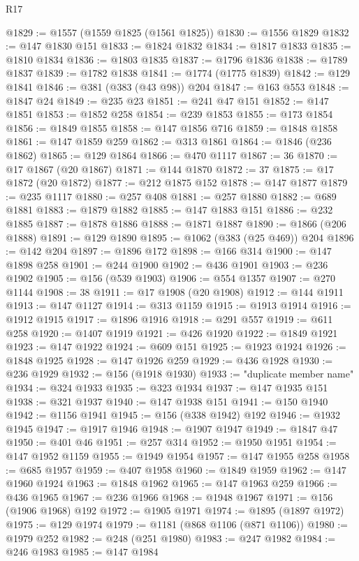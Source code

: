 \begin{lexlean}{R17}
\begin{coremodule}
@1829 := @1557 (@1559 @1825 (@1561 @1825))
@1830 := @1556 @1829
@1832 := @147 @1830 @151
@1833 := @1824 @1832
@1834 := @1817 @1833
@1835 := @1810 @1834
@1836 := @1803 @1835
@1837 := @1796 @1836
@1838 := @1789 @1837
@1839 := @1782 @1838
@1841 := @1774 (@1775 @1839)
@1842 := @129 @1841
@1846 := @381 (@383 (@43 @98)) @204
@1847 := @163 @553
@1848 := @1847 @24
@1849 := @235 @23
@1851 := @241 @47 @151
@1852 := @147 @1851
@1853 := @1852 @258
@1854 := @239 @1853
@1855 := @173 @1854
@1856 := @1849 @1855
@1858 := @147 @1856 @716
@1859 := @1848 @1858
@1861 := @147 @1859 @259
@1862 := @313 @1861
@1864 := @1846 (@236 @1862)
@1865 := @129 @1864
@1866 := @470 @1117
@1867 := 36
@1870 := @17 @1867 (@20 @1867)
@1871 := @144 @1870
@1872 := 37
@1875 := @17 @1872 (@20 @1872)
@1877 := @212 @1875 @152
@1878 := @147 @1877
@1879 := @235 @1117
@1880 := @257 @408
@1881 := @257 @1880
@1882 := @689 @1881
@1883 := @1879 @1882
@1885 := @147 @1883 @151
@1886 := @232 @1885
@1887 := @1878 @1886
@1888 := @1871 @1887
@1890 := @1866 (@206 @1888)
@1891 := @129 @1890
@1895 := @1062 (@383 (@25 @469)) @204
@1896 := @142 @204
@1897 := @1896 @172
@1898 := @166 @314
@1900 := @147 @1898 @258
@1901 := @244 @1900
@1902 := @436 @1901
@1903 := @236 @1902
@1905 := @156 (@539 @1903)
@1906 := @554 @1357
@1907 := @270 @1144
@1908 := 38
@1911 := @17 @1908 (@20 @1908)
@1912 := @144 @1911
@1913 := @147 @1127
@1914 := @313 @1159
@1915 := @1913 @1914
@1916 := @1912 @1915
@1917 := @1896 @1916
@1918 := @291 @557
@1919 := @611 @258
@1920 := @1407 @1919
@1921 := @426 @1920
@1922 := @1849 @1921
@1923 := @147 @1922
@1924 := @609 @151
@1925 := @1923 @1924
@1926 := @1848 @1925
@1928 := @147 @1926 @259
@1929 := @436 @1928
@1930 := @236 @1929
@1932 := @156 (@1918 @1930)
@1933 := "duplicate member name"
@1934 := @324 @1933
@1935 := @323 @1934
@1937 := @147 @1935 @151
@1938 := @321 @1937
@1940 := @147 @1938 @151
@1941 := @150 @1940
@1942 := @1156 @1941
@1945 := @156 (@338 @1942) @192
@1946 := @1932 @1945
@1947 := @1917 @1946
@1948 := @1907 @1947
@1949 := @1847 @47
@1950 := @401 @46
@1951 := @257 @314
@1952 := @1950 @1951
@1954 := @147 @1952 @1159
@1955 := @1949 @1954
@1957 := @147 @1955 @258
@1958 := @685 @1957
@1959 := @407 @1958
@1960 := @1849 @1959
@1962 := @147 @1960 @1924
@1963 := @1848 @1962
@1965 := @147 @1963 @259
@1966 := @436 @1965
@1967 := @236 @1966
@1968 := @1948 @1967
@1971 := @156 (@1906 @1968) @192
@1972 := @1905 @1971
@1974 := @1895 (@1897 @1972)
@1975 := @129 @1974
@1979 := @1181 (@868 @1106 (@871 @1106))
@1980 := @1979 @252
@1982 := @248 (@251 @1980)
@1983 := @247 @1982
@1984 := @246 @1983
@1985 := @147 @1984

\end{coremodule}
\end{lexlean}
